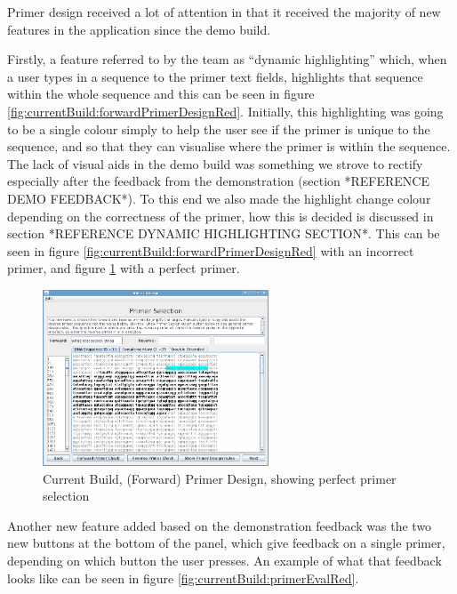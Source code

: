 Primer design received a lot of attention in that it received the
majority of new features in the application since the demo build.

Firstly, a feature referred to by the team as ``dynamic highlighting''
which, when a user types in a sequence to the primer text fields,
highlights that sequence within the whole sequence and this can be
seen in figure \ref{fig:currentBuild:forwardPrimerDesignRed}.
Initially, this highlighting was going to be a single colour simply to
help the user see if the primer is unique to the sequence, and so that
they can visualise where the primer is within the sequence.
The lack of visual aids in the demo build was something we strove to
rectify especially after the feedback from the demonstration (section
*REFERENCE DEMO FEEDBACK*).
To this end we also made the highlight change colour depending on the
correctness of the primer, how this is decided is discussed in section
*REFERENCE DYNAMIC HIGHLIGHTING SECTION*.
This can be seen in figure
\ref{fig:currentBuild:forwardPrimerDesignRed} with an incorrect
primer, and figure \ref{fig:currentBuild:forwardPerfectPrimer} with a
perfect primer.

\begin{figure}[h]
  \begin{center}
    \includegraphics[width=0.6\textwidth]{./images/currentBuild/forwardPerfectPrimer.png}
    \caption{
      \label{fig:currentBuild:forwardPerfectPrimer}
      Current Build, (Forward) Primer Design, showing perfect primer selection
    }
  \end{center}
\end{figure}

Another new feature added based on the demonstration feedback was the
two new buttons at the bottom of the panel, which give feedback on a
single primer, depending on which button the user presses.
An example of what that feedback looks like can be seen in figure
\ref{fig:currentBuild:primerEvalRed}.

